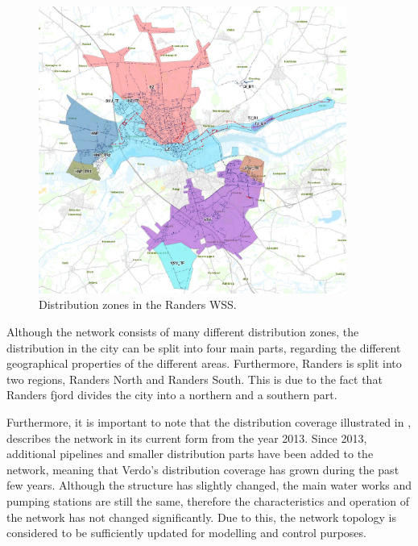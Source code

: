\begin{figure}[H]
\centering
\includegraphics[width=0.9\textwidth]{report/pictures/level_zones}
\caption{Distribution zones in the Randers WSS.}
\label{fig:level_zones}
\end{figure}

\vspace{-3mm}

Although the network consists of many different distribution zones, the distribution in the city can be split into four main parts, regarding the different geographical properties of the different areas. Furthermore, Randers is split into two regions, Randers North and Randers South. This is due to the fact that Randers fjord divides the city into a northern and a southern part\cite{verdo}. 

Furthermore, it is important to note that the distribution coverage illustrated in , describes the network in its current form from the year 2013. Since 2013, additional pipelines and smaller distribution parts have been added to the network, meaning that Verdo's distribution coverage has grown during the past few years. Although the structure has slightly changed, the main water works and pumping stations are still the same, therefore the characteristics and operation of the network has not changed significantly. Due to this, the network topology is considered to be sufficiently updated for modelling and control purposes. 

